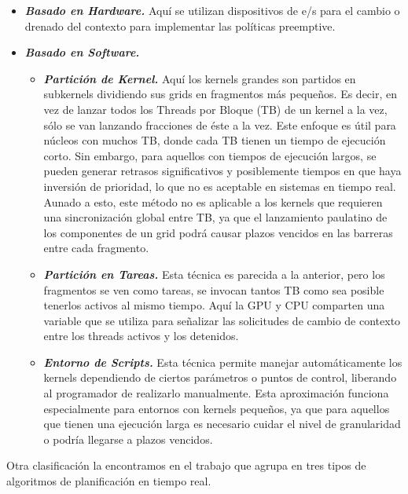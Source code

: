 \begin{itemize}
\item \textbf{\textit{Basado en Hardware.}} 
	Aquí se utilizan dispositivos de e/s para el cambio o drenado del contexto para implementar las políticas preemptive. 	

\item \textbf{\textit{Basado en Software.}}
	\begin{itemize}
	\item \textbf{\textit{Partición de Kernel.}}
		Aquí los kernels grandes son partidos en subkernels dividiendo sus grids en fragmentos más pequeños. Es decir, en vez de lanzar todos los Threads por Bloque (TB) de un kernel a la vez, sólo se van lanzando fracciones de éste a la vez. Este enfoque es útil para núcleos con muchos TB, donde cada TB tienen un tiempo de ejecución corto. Sin embargo, para aquellos con tiempos de ejecución largos, se pueden generar retrasos significativos y posiblemente tiempos en que haya inversión de prioridad, lo que no es aceptable en sistemas en tiempo real. Aunado a esto, este método no es aplicable a los kernels que requieren una sincronización global entre TB, ya que el lanzamiento paulatino de los componentes de un grid podrá causar plazos vencidos en las barreras entre cada fragmento.
	
	\item \textbf{\textit{Partición en Tareas.}}
		Esta técnica es parecida a la anterior, pero los fragmentos se ven como tareas, se invocan tantos TB como sea posible tenerlos activos al mismo tiempo. Aquí la GPU y CPU comparten una variable que se utiliza para señalizar las solicitudes de cambio de contexto entre los threads activos y los detenidos.

	\item \textbf{\textit{Entorno de Scripts.}}	
		Esta técnica permite manejar automáticamente los kernels dependiendo de ciertos parámetros o puntos de control, liberando al programador de realizarlo manualmente. Esta aproximación funciona especialmente para entornos con kernels pequeños, ya que para aquellos que tienen una ejecución larga es necesario cuidar el nivel de granularidad o podría llegarse a plazos vencidos.
		
	\end {itemize}
\end {itemize}

\vspace{0.3cm}
	
Otra clasificación la encontramos en el trabajo \cite{DynSche} que agrupa en tres tipos de algoritmos de planificación en tiempo real.

